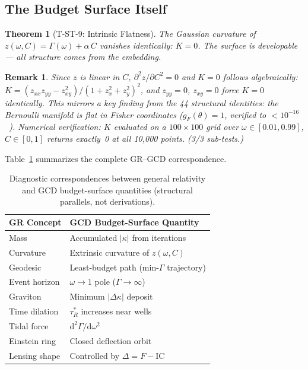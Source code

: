 \documentclass[
  aps,
  prd,
  twocolumn,
  superscriptaddress,
  nofootinbib,
  floatfix
]{revtex4-2}
\newtheorem{theorem}{Theorem}
\newtheorem{remark}{Remark}
\newcommand{\tR}{\tau_{\!R}^{*}}
\newcommand{\Gam}{\Gamma}
\newcommand{\dd}{\mathrm{d}}
\newcommand{\IC}{\mathrm{IC}}
\begin{document}
\subsection{The Budget Surface Itself}

\begin{theorem}[T-ST-9: Intrinsic Flatness]\label{thm:T9}
The Gaussian curvature of $z(\omega, C) = \Gam(\omega) +
\alpha\,C$ vanishes identically: $K = 0$.  The surface is
developable --- all structure comes from the embedding.
\end{theorem}

\begin{remark}
Since $z$ is linear in $C$, $\partial^2 z/\partial C^2 = 0$
and $K = 0$ follows algebraically: $K = (z_{xx}z_{yy} -
z_{xy}^2)/(1 + z_x^2 + z_y^2)^2$, and $z_{yy} = 0$,
$z_{xy} = 0$ force $K = 0$ identically.  This mirrors a key
finding from the 44 structural identities: the Bernoulli
manifold is flat in Fisher coordinates ($g_F(\theta) = 1$,
verified to $< 10^{-16}$~\cite{paulus2025umcp}).  Numerical
verification: $K$ evaluated on a $100 \times 100$ grid over
$\omega \in [0.01, 0.99]$, $C \in [0, 1]$ returns exactly~0
at all 10,000 points.  (3/3 sub-tests.)
\end{remark}

Table~\ref{tab:translation} summarizes the complete GR--GCD
correspondence.

\begin{table}[htbp]
\caption{\label{tab:translation}Diagnostic correspondences
between general relativity and GCD budget-surface quantities
(structural parallels, not derivations).}
\begin{ruledtabular}
\begin{tabular}{ll}
GR Concept & GCD Budget-Surface Quantity \\
\hline
Mass & Accumulated $|\kappa|$ from iterations \\
Curvature & Extrinsic curvature of $z(\omega, C)$ \\
Geodesic & Least-budget path (min-$\Gam$ trajectory) \\
Event horizon & $\omega \to 1$ pole ($\Gam \to \infty$) \\
Graviton & Minimum $|\Delta\kappa|$ deposit \\
Time dilation & $\tR$ increases near wells \\
Tidal force & $\dd^2\Gam/\dd\omega^2$ \\
Einstein ring & Closed deflection orbit \\
Lensing shape & Controlled by $\Delta = F - \IC$ \\
\end{tabular}
\end{ruledtabular}
\end{table}
\end{document}
